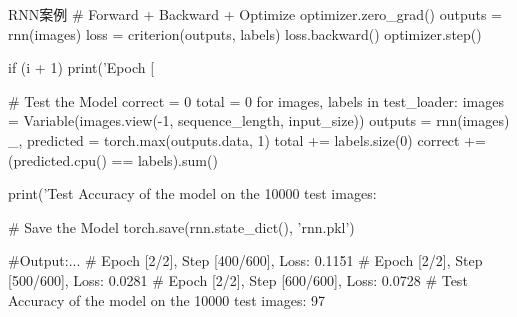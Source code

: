 \documentclass[openbib]{article}
\begin{document}
\begin{Python}{RNN案例}
	# Forward + Backward + Optimize
	optimizer.zero_grad()
	outputs = rnn(images)
	loss = criterion(outputs, labels)
	loss.backward()
	optimizer.step()
	
	if (i + 1) %
	print('Epoch [%
	
	# Test the Model
	correct = 0
	total = 0
	for images, labels in test_loader:
	images = Variable(images.view(-1, sequence_length, input_size))
	outputs = rnn(images)
	_, predicted = torch.max(outputs.data, 1)
	total += labels.size(0)
	correct += (predicted.cpu() == labels).sum()
	
	print('Test Accuracy of the model on the 10000 test images: %
	
	# Save the Model
	torch.save(rnn.state_dict(), 'rnn.pkl')
	
	#Output:...
	#       Epoch [2/2], Step [400/600], Loss: 0.1151
	#       Epoch [2/2], Step [500/600], Loss: 0.0281
	#       Epoch [2/2], Step [600/600], Loss: 0.0728
	#       Test Accuracy of the model on the 10000 test images: 97 %
\end{Python}
\end{document}
